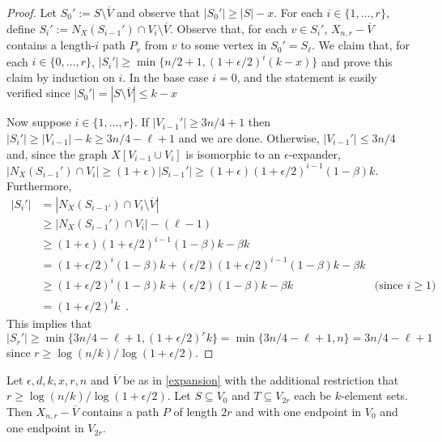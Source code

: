 \documentclass{patmorin}
\begin{document}
\begin{proof}
  Let $S_0':= S\setminus\overline{V}$ and observe that $|S_0'|\ge |S|-x$.  For each $i\in\{1,\ldots,r\}$, define
  $S_i':=N_X(S_{i-1}')\cap V_i\setminus \overline{V}$.
  Observe that, for each $v\in S_i'$, $X_{n,r}-\overline{V}$ contains a length-$i$ path $P_v$ from $v$ to some vertex in $S_0'=S_{\ell}$.  We claim that, for each $i\in\{0,\ldots,r\}$,
  $|S_i'|\ge \min\{n/2+1,(1+\epsilon/2)^i(k-x)\}$
  and prove this claim by induction on $i$.  In the base case $i=0$, and the statement is easily verified since $|S_0'|=|S\setminus\overline{V}|\le k-x$


  Now suppose $i\in\{1,\ldots,r\}$.  If $|V_{i-1}'|\ge 3n/4+1$ then $|S_i'|\ge |V_{i-1}|-k\ge 3n/4-\ell+1$ and we are done.  Otherwise, $|V_{i-1}'|\le 3n/4$ and, since the graph $X[V_{i-1}\cup V_i]$ is isomorphic to an $\epsilon$-expander,  $|N_X(S_{i-1}')\cap V_i| \ge (1+\epsilon)|S_{i-1}'|\ge (1+\epsilon)(1+\epsilon/2)^{i-1}(1-\beta)k$.  Furthermore,
  \begin{align*}
    |S_i'| & = |N_X(S_{i-1'})\cap V_i\setminus \overline{V}| \\
      & \ge |N_X(S_{i-1}')\cap V_i|-(\ell-1) \\
      & \ge (1+\epsilon)(1+\epsilon/2)^{i-1}(1-\beta)k-\beta k \\
      & = (1+\epsilon/2)^i(1-\beta)k + (\epsilon/2)(1+\epsilon/2)^{i-1}(1-\beta) k - \beta k \\
      & \ge (1+\epsilon/2)^i(1-\beta)k + (\epsilon/2)(1-\beta) k - \beta k
       & \text{(since $i\ge 1$)} \\
      & = (1+\epsilon/2)^ik \enspace .
  \end{align*}
  This implies that
  \[
    |S_r'|\ge \min\{3n/4-\ell+1,(1+\epsilon/2)^rk\} = \min\{3n/4-\ell+1,n\} = 3n/4-\ell+1
  \]
  since $r\ge \log(n/k)/\log(1+\epsilon/2)$.
\end{proof}

\begin{lem}\label{menger}
  Let $\epsilon, d, k, x, r, n$ and $\overline{V}$ be as in \cref{expansion} with the additional restriction that $r\ge\log(n/k)/\log(1+\epsilon/2)$. Let $S\subseteq V_0$ and $T\subseteq V_{2r}$ each be $k$-element sets.  Then $X_{n,r}-\overline{V}$ contains a path $P$ of length $2r$ and with one endpoint in $V_0$ and one endpoint in $V_{2r}$.
\end{lem}
\end{document}
